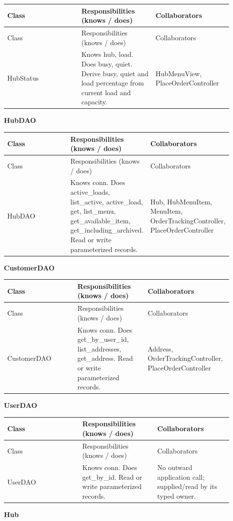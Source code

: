 \begin{longtable}{>{\raggedright\arraybackslash}p{0.3067\linewidth}>{\raggedright\arraybackslash}p{0.3067\linewidth}>{\raggedright\arraybackslash}p{0.3067\linewidth}}
Class & Responsibilities (knows / does) & Collaborators \\
\hline\endfirsthead
Class & Responsibilities (knows / does) & Collaborators \\
\hline\endhead
HubStatus & Knows hub, load. Does busy, quiet. Derive busy, quiet and load percentage from current load and capacity. & HubMenuView, PlaceOrderController \\
\end{longtable}
\textbf{HubDAO}

\begin{longtable}{>{\raggedright\arraybackslash}p{0.3067\linewidth}>{\raggedright\arraybackslash}p{0.3067\linewidth}>{\raggedright\arraybackslash}p{0.3067\linewidth}}
Class & Responsibilities (knows / does) & Collaborators \\
\hline\endfirsthead
Class & Responsibilities (knows / does) & Collaborators \\
\hline\endhead
HubDAO & Knows conn. Does active\_loads, list\_active, active\_load, get, list\_menu, get\_available\_item, get\_including\_archived. Read or write parameterized records. & Hub, HubMenuItem, MenuItem, OrderTrackingController, PlaceOrderController \\
\end{longtable}
\textbf{CustomerDAO}

\begin{longtable}{>{\raggedright\arraybackslash}p{0.3067\linewidth}>{\raggedright\arraybackslash}p{0.3067\linewidth}>{\raggedright\arraybackslash}p{0.3067\linewidth}}
Class & Responsibilities (knows / does) & Collaborators \\
\hline\endfirsthead
Class & Responsibilities (knows / does) & Collaborators \\
\hline\endhead
CustomerDAO & Knows conn. Does get\_by\_user\_id, list\_addresses, get\_address. Read or write parameterized records. & Address, OrderTrackingController, PlaceOrderController \\
\end{longtable}
\textbf{UserDAO}

\begin{longtable}{>{\raggedright\arraybackslash}p{0.3067\linewidth}>{\raggedright\arraybackslash}p{0.3067\linewidth}>{\raggedright\arraybackslash}p{0.3067\linewidth}}
Class & Responsibilities (knows / does) & Collaborators \\
\hline\endfirsthead
Class & Responsibilities (knows / does) & Collaborators \\
\hline\endhead
UserDAO & Knows conn. Does get\_by\_id. Read or write parameterized records. & No outward application call; supplied/read by its typed owner. \\
\end{longtable}
\textbf{Hub}

